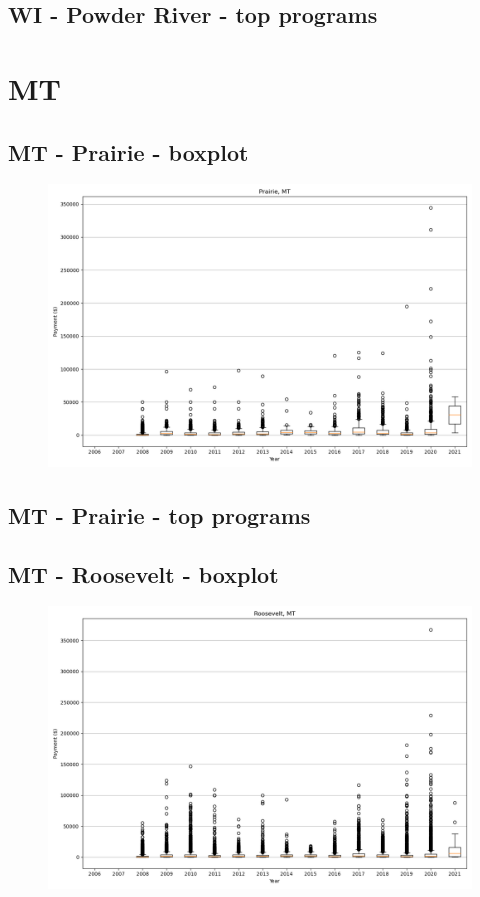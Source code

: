 \subsection*{WI - Powder River - top programs}

\newpage
\section*{MT}
\subsection*{MT - Prairie - boxplot}
\begin{figure}[h]
\centering
\includegraphics[width=7in]{../output/boxplots/counties/Prairie-MT_boxplot.png}
\end{figure}


\subsection*{MT - Prairie - top programs}

\newpage
\subsection*{MT - Roosevelt - boxplot}
\begin{figure}[h]
\centering
\includegraphics[width=7in]{../output/boxplots/counties/Roosevelt-MT_boxplot.png}
\end{figure}


